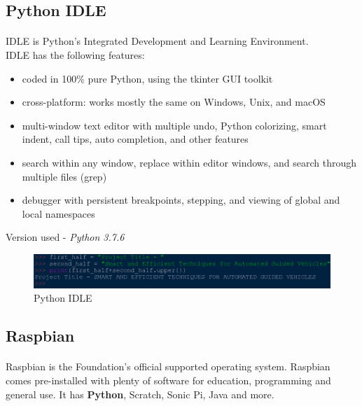 \subsection{Python IDLE}
\paragraph{}

IDLE is Python’s Integrated Development and Learning Environment.\\
IDLE has the following features:

\begin{itemize}
    \item coded in 100\% pure Python, using the tkinter GUI toolkit
    
    \item cross-platform: works mostly the same on Windows, Unix, and macOS
    
    \item multi-window text editor with multiple undo, Python colorizing, smart indent, call tips, auto completion, and other features
    
    \item search within any window, replace within editor windows, and search through multiple files (grep)
    
    \item debugger with persistent breakpoints, stepping, and viewing of global and local namespaces

\end{itemize}
Version used - \textit{Python 3.7.6}

\begin{figure}[H]
\centering
\includegraphics[width = \textwidth]{project/images/python_idle.png}
\caption{Python IDLE}
\end{figure}

\subsection{Raspbian}
\paragraph{}Raspbian is the Foundation’s official supported operating system. Raspbian comes pre-installed with plenty of software for education, programming and general use. It has \textbf{Python}, Scratch, Sonic Pi, Java and more. %

